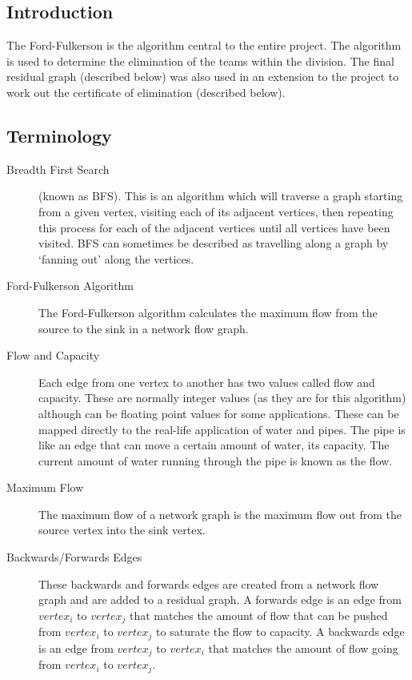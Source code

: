 \subsection{Introduction}

The Ford-Fulkerson is the algorithm central to the entire project. The
algorithm is used to determine the elimination of the teams within the
division. The final residual graph (described below) was also used in an
extension to the project to work out the certificate of elimination
(described below).

\subsection{Terminology}

\begin{description}

\item[Breadth First Search] (known as BFS). This is an algorithm which will
traverse a graph starting from a given vertex, visiting each of its
adjacent vertices, then repeating this process for each of the adjacent
vertices until all vertices have been visited. BFS can sometimes be described
as travelling along a graph by `fanning out' along the vertices.

\item[Ford-Fulkerson Algorithm] The Ford-Fulkerson algorithm calculates the
maximum flow from the source to the sink in a network flow graph.

\item[Flow and Capacity] Each edge from one vertex to another has two values
called flow and capacity. These are normally integer values (as they are for 
this algorithm) although can be floating point values for some applications.
These can be mapped directly to the real-life application of water and pipes.
The pipe is like an edge that can move a certain amount of water, its capacity.
The current amount of water running through the pipe is known as the flow.

\item[Maximum Flow] The maximum flow of a network graph is the maximum flow
out from the source vertex into the sink vertex.

\item[Backwards/Forwards Edges] These backwards and forwards edges are
created from a network flow graph and are added to a residual graph. A
forwards edge is an edge from $vertex_i$ to $vertex_j$ that matches the
amount of flow that can be pushed from $vertex_i$ to $vertex_j$ to
saturate the flow to capacity. A backwards edge is an edge from $vertex_j$
to $vertex_i$ that matches the amount of flow going from $vertex_i$ to
$vertex_j$.


\end{description}
